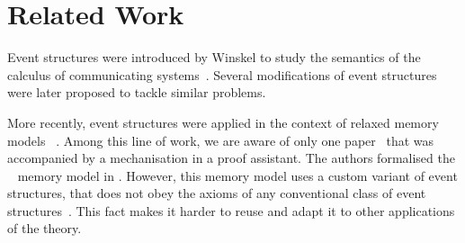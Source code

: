 \section{Related Work}

Event structures were introduced by Winskel to study the semantics of 
the calculus of communicating systems~\cite{Winskel:86, Winskel:82}. 
Several modifications of event structures~\cite{Langerak:91, Boudol-Castellani:1991}
were later proposed to tackle similar problems.  
 
More recently, event structures were applied 
in the context of relaxed memory models~%
\cite{Jeffrey-Riely:LICS16, PichonPharabod-Sewell:POPL16, Chakraborty-Vafeiadis:POPL19, Moiseenko-al:ECOOP20}.
Among this line of work, we are aware of only one paper~\cite{Moiseenko-al:ECOOP20}
that was accompanied by a mechanisation in a proof assistant. 
The authors formalised the \weakestmo~\cite{Chakraborty-Vafeiadis:POPL19} 
memory model in \coq. However, this memory model uses 
a custom variant of event structures, that does not 
obey the axioms of any conventional class of 
event structures~\cite{Winskel:82, Langerak:91, Boudol-Castellani:1991}. 
This fact makes it harder to reuse and adapt it 
to other applications of the theory. 


